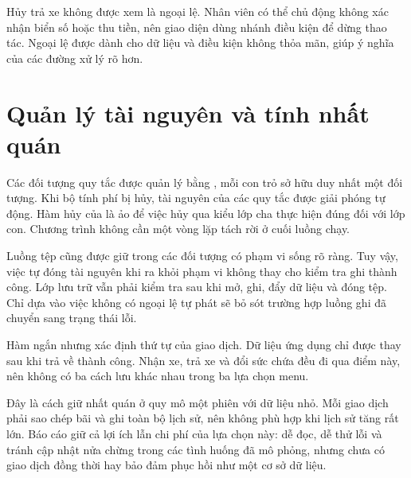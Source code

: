 Hủy trả xe không được xem là ngoại lệ. Nhân viên có thể chủ động không xác nhận biển số hoặc thu tiền, nên giao diện dùng nhánh điều kiện để dừng thao tác. Ngoại lệ được dành cho dữ liệu và điều kiện không thỏa mãn, giúp ý nghĩa của các đường xử lý rõ hơn.

\section{Quản lý tài nguyên và tính nhất quán}
Các đối tượng quy tắc được quản lý bằng , mỗi con trỏ sở hữu duy nhất một đối tượng. Khi bộ tính phí bị hủy, tài nguyên của các quy tắc được giải phóng tự động. Hàm hủy của  là ảo để việc hủy qua kiểu lớp cha thực hiện đúng đối với lớp con. Chương trình không cần một vòng lặp  tách rời ở cuối luồng chạy.

Luồng tệp cũng được giữ trong các đối tượng có phạm vi sống rõ ràng. Tuy vậy, việc tự đóng tài nguyên khi ra khỏi phạm vi không thay cho kiểm tra ghi thành công. Lớp lưu trữ vẫn phải kiểm tra sau khi mở, ghi, đẩy dữ liệu và đóng tệp. Chỉ dựa vào việc không có ngoại lệ tự phát sẽ bỏ sót trường hợp luồng ghi đã chuyển sang trạng thái lỗi.


Hàm  ngắn nhưng xác định thứ tự của giao dịch. Dữ liệu ứng dụng chỉ được thay sau khi  trả về thành công. Nhận xe, trả xe và đổi sức chứa đều đi qua điểm này, nên không có ba cách lưu khác nhau trong ba lựa chọn menu.

Đây là cách giữ nhất quán ở quy mô một phiên với dữ liệu nhỏ. Mỗi giao dịch phải sao chép bãi và ghi toàn bộ lịch sử, nên không phù hợp khi lịch sử tăng rất lớn. Báo cáo giữ cả lợi ích lẫn chi phí của lựa chọn này: dễ đọc, dễ thử lỗi và tránh cập nhật nửa chừng trong các tình huống đã mô phỏng, nhưng chưa có giao dịch đồng thời hay bảo đảm phục hồi như một cơ sở dữ liệu.
